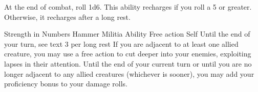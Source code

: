 At the end of combat, roll 1d6.
This ability recharges if you roll a 5 or greater.
Otherwise, it recharges after a long rest.


\ability%
    {Strength in Numbers}
    {Hammer Militia Ability}
    {Free action}
    {Self}
    {Until the end of your turn, see text}
    {3 per long rest}
If you are adjacent to at least one allied creature,
you may use a free action to cut deeper into your enemies,
exploiting lapses in their attention.
Until the end of your current turn
or until you are no longer adjacent to any allied creatures
(whichever is sooner),
you may add your proficiency bonus to your damage rolls.


